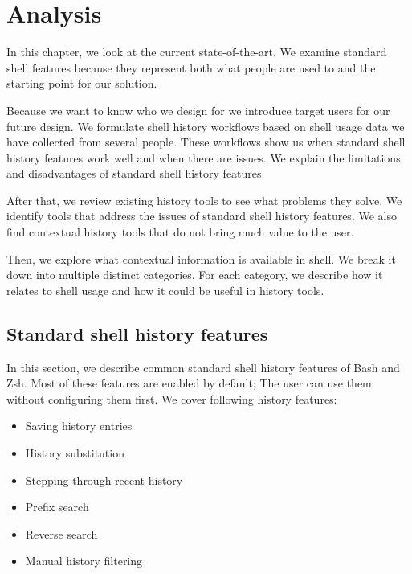 
\chapter{Analysis}

In this chapter, we look at the current state-of-the-art. 
We examine standard shell features because they represent both what people are used to and the starting point for our solution.

Because we want to know who we design for we introduce target users for our future design. We formulate shell history workflows based on shell usage data we have collected from several people. %
These workflows show us when standard shell history features work well and when there are issues. We explain the limitations and disadvantages of standard shell history features.

After that, we review existing history tools to see what problems they solve. We identify tools that address the issues of standard shell history features. We also find contextual history tools that do not bring much value to the user.

Then, we explore what contextual information is available in shell. We break it down into multiple distinct categories. For each category, we describe how it relates to shell usage and how it could be useful in history tools.


\section{Standard shell history features}

In this section, we describe common standard shell history features of Bash\cite{bashman} and Zsh\cite{zshdocs}. Most of these features are enabled by default; The user can use them without configuring them first.
We cover following history features:


\begin{itemize}
    \item Saving history entries
    \item History substitution
    \item Stepping through recent history
    \item Prefix search
    \item Reverse search
    \item Manual history filtering
\end{itemize}


